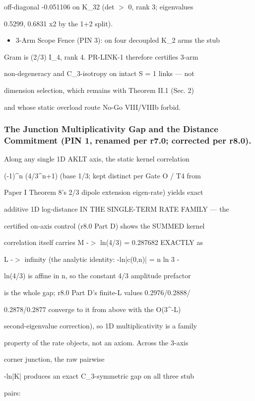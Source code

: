 \documentclass[11pt,a4paper]{article}
\theoremstyle{definition}
\begin{document}
    off-diagonal -0.051106 on K\_32 (det $>$ 0, rank 3; eigenvalues

    0.5299, 0.6831 x2 by the 1+2 split).


\begin{itemize}[leftmargin=1.4em]
\item 3-Arm Scope Fence (PIN 3): on four decoupled K\_2 arms the stub
\end{itemize}
    Gram is (2/3) I\_4, rank 4. PR-LINK-1 therefore certifies 3-arm

    non-degeneracy and C\_3-isotropy on intact S = 1 links — not

    dimension selection, which remains with Theorem II.1 (Sec. 2)

    and whose static overload route No-Go VIII/VIIIb forbid.


\subsubsection{The Junction Multiplicativity Gap and the Distance Commitment (PIN 1, renamed per r7.0; corrected per r8.0).}
Along any single 1D AKLT axis, the static kernel correlation

(-1)\^{}n (4/3\^{}{n+1}) (base 1/3; kept distinct per Gate O / T4 from

Paper I Theorem 8's 2/3 dipole extension eigen-rate) yields exact

additive 1D log-distance IN THE SINGLE-TERM RATE FAMILY — the

certified on-axis control (r8.0 Part D) shows the SUMMED kernel

correlation itself carries M -$>$ ln(4/3) = 0.287682 EXACTLY as

L -$>$ infinity (the analytic identity: -ln|c(0,n)| = n ln 3 -

ln(4/3) is affine in n, so the constant 4/3 amplitude prefactor

is the whole gap; r8.0 Part D's finite-L values 0.2976/0.2888/

0.2878/0.2877 converge to it from above with the O(3\^{}-L)

second-eigenvalue correction), so 1D multiplicativity is a family

property of the rate objects, not an axiom. Across the 3-axis

corner junction, the raw pairwise

-ln|K| produces an exact C\_3-symmetric gap on all three stub

pairs:
\end{document}
